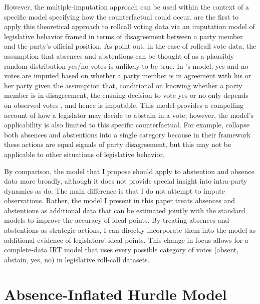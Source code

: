 	However, the multiple-imputation approach can be used within the context of a specific model specifying how the counterfactual could occur. \textcite{rosas2015} are the first to apply this theoretical approach to rollcall voting data via an imputation model of legislative behavior framed in terms of disagreement between a party member and the party's official position.  As \textcite{rosas2015} point out, in the case of rollcall vote data, the assumption that absences and abstentions can be thought of as a plausibly random distribution yes/no votes is unlikely to be true. In \citeauthor{rosas2015}'s model, yes and no votes are imputed based on whether a party member is in agreement with his or her party given the assumption that, conditional on knowing whether a party member is in disagreement, the ensuing decision to vote yes or no only depends on observed votes \parencite{rubin2002}, and hence is imputable. This model provides a compelling account of how a legislator may decide to abstain in a vote; however, the model's applicability is also limited to this specific counterfactual. For example, \citeauthor{rosas2015} collapse both absences and abstentions into a single category because in their framework these actions are equal signals of party disagreement, but this may not be applicable to other situations of legislative behavior.
	
	By comparison, the model that I propose should apply to abstention and absence data more broadly, although it does not provide special insight into intra-party dynamics as \textcite{rosas2015} do. The main difference is that I do not attempt to impute observations. Rather, the model I present in this paper treats absences and abstentions as additional data that can be estimated jointly with the standard models to improve the accuracy of ideal points. By treating absences and abstentions as strategic actions, I can directly incorporate them into the model as additional evidence of legislators' ideal points. This change in focus allows for a complete-data IRT model that uses every possible category of votes (absent, abstain, yes, no) in legislative roll-call datasets.
	
	
	
	\section{Absence-Inflated Hurdle Model}
	
